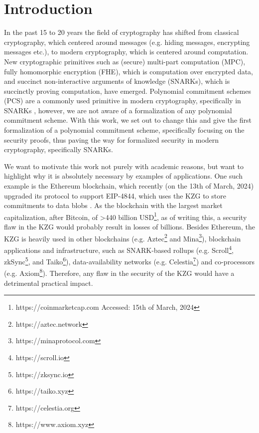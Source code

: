 
\chapter{Introduction}\label{chapter:introduction}
In the past 15 to 20 years the field of cryptography has shifted from classical cryptography, which centered around messages (e.g. hiding messages, encrypting messages etc.), to modern cryptography, which is centered around computation. New cryptographic primitives such as (secure) multi-part computation (MPC)\parencite{boneh_shoup}, fully homomorphic encryption (FHE)\parencite{fhe}, which is computation over encrypted data, and succinct non-interactive arguments of knowledge (SNARKs)\parencite{thalerbook}, which is succinctly proving computation, have emerged. Polynomial commitment schemes (PCS) are a commonly used primitive in modern cryptography, specifically in SNARKs \parencite{thalerbook,boneh_shoup}, however, we are not aware of a formalization of any polynomial commitment scheme. With this work, we set out to change this and give the first formalization of a polynomial commitment scheme, specifically focusing on the security proofs, thus paving the way for formalized security in modern cryptography, specifically SNARKs.

We want to motivate this work not purely with academic reasons, but want to highlight why it is absolutely necessary by examples of applications. One such example is the Ethereum blockchain, which recently (on the 13th of March, 2024) upgraded its protocol to support EIP-4844, which uses the KZG to store commitments to data blobs \parencite{EIP4844}. As the blockchain with the largest market capitalization, after Bitcoin, of >440 billion USD\footnote{https://coinmarketcap.com Accessed: 15th of March, 2024}, as of writing this, a security flaw in the KZG would probably result in losses of billions. Besides Ethereum, the KZG is heavily used in other blockchains (e.g. Aztec\footnote{https://aztec.network} and Mina\footnote{https://minaprotocol.com}), blockchain applications and infrastructure, such as SNARK-based rollups (e.g. Scroll\footnote{https://scroll.io}, zkSync\footnote{https://zksync.io}, and Taiko\footnote{https://taiko.xyz}), data-availability networks (e.g. Celestia\footnote{https://celestia.org}) and co-processors (e.g. Axiom\footnote{https://www.axiom.xyz}). Therefore, any flaw in the security of the KZG would have a detrimental practical impact. 

